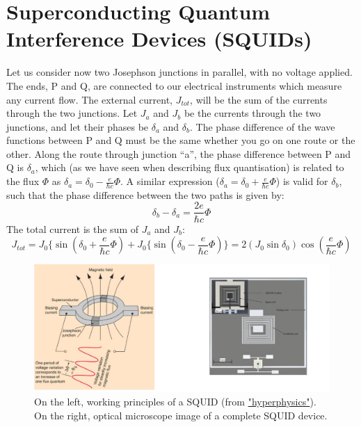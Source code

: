 \documentclass[a4paper,11pt]{article}
\begin{document}
\section {Superconducting Quantum Interference Devices (SQUIDs)}
Let us consider now two Josephson junctions in parallel, with no voltage applied. The ends, P and Q, are connected to our electrical instruments which measure any current flow. The external current, $J_{tot}$, will be the sum of the currents through the two junctions. Let $J_a$ and $J_b$ be the currents through the two junctions, and let their phases be $\delta_a$ and $\delta_b$. The phase difference of the wave functions between P and Q must be the same whether you go on one route or the other. Along the route through junction “a”, the phase difference between P and Q is $\delta_a$, which (as we have seen when describing flux quantisation) is related to the flux $\Phi$ as $\delta_a = \delta_0 - \frac{e}{\hbar c} \Phi $. A similar expression ($\delta_a = \delta_0 + \frac{e}{\hbar c} \Phi $) is valid for $\delta_b$, such that the phase difference between the two paths is given by:
\begin{equation}
    \delta_b- \delta_a = \frac{2e}{\hbar c} \Phi 
\end{equation}
The total current is the sum of $J_a$ and $J_b$:
\begin{equation}
    J_{tot} = J_0 \lbrace \sin \left( \delta_0 + \frac{e}{\hbar c} \Phi \right) + J_0 \lbrace \sin \left( \delta_0 -  \frac{e}{\hbar c} \Phi \right)  \rbrace = 2 \left( J_0 \sin \delta_0 \right) \cos \left( \frac{e}{\hbar c} \Phi \right)
\end{equation}

\begin{figure}[h]
\centering
\includegraphics[width = 1\textwidth]{figures/SQUID.png}
\caption{On the left, working principles of a SQUID (from \href{http://hyperphysics.phy-astr.gsu.edu/hbase/Solids/Squid.html}{"hyperphysics"}). On the right, optical microscope image of a complete SQUID device.}
\label{fig:SQUID}
\end{figure}
\end{document}
